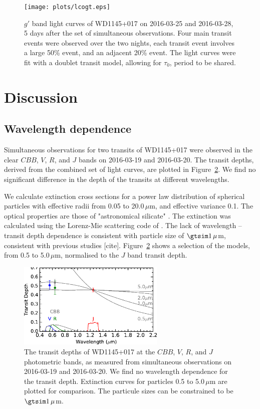 \documentclass[iop,useAMES,usenatbig]{emulateapj}
\begin{document}
\begin{figure}
    \centering
    \texttt{[image: plots/lcogt.eps]}
    \caption{$g'$ band light curves of WD1145+017 on 2016-03-25 and 2016-03-28, 5 days after the set of simultaneous observations. Four main transit events were observed over the two nights, each transit event involves a large 50\% event, and an adjacent 20\% event. The light curves were fit with a doublet transit model, allowing for $\tau_0$, period to be shared.}
    \label{fig:lcogt}
\end{figure}

\section{Discussion}
\label{sec:discussion}

\subsection{Wavelength dependence}

Simultaneous observations for two transits of WD1145+017 were observed in the clear $CBB$, $V$, $R$, and $J$ bands on 2016-03-19 and 2016-03-20. The transit depths, derived from the combined set of light curves, are plotted in Figure~\ref{fig:band_depth}. We find no significant difference in the depth of the transits at different wavelengths. 

We calculate extinction cross sections for a power law distribution of spherical particles \citep[as defined by ][]{1974SSRv...16..527H} with effective radii from 0.05 to 20.0\,$\mu$m, and effective variance 0.1. The optical properties are those of "astronomical silicate" \citep{1984ApJ...285...89D,1993ApJ...402..441L}. The extinction was calculated using the Lorenz-Mie scattering code of \citet{2002sael.book.....M}. The lack of wavelength -- transit depth dependence is consistent with particle size of $\gtsim 1\,\mu$m, consistent with previous studies [cite]. Figure~\ref{fig:band_depth} shows a selection of the models, from 0.5 to 5.0\,$\mu$m, normalised to the $J$ band transit depth.

\begin{figure}
    \centering
    \includegraphics[width=7cm]{plots/band_depth.eps}
    \caption{The transit depths of WD1145+017 at the $CBB$, $V$, $R$, and $J$ photometric bands, as measured from simultaneous observations on 2016-03-19 and 2016-03-20. We find no wavelength dependence for the transit depth. Extinction curves for particles 0.5 to 5.0\,$\mu$m are plotted for comparison. The particule sizes can be constrained to be $\gtsim 1\,\mu$m.}
    \label{fig:band_depth}
\end{figure}
\end{document}
